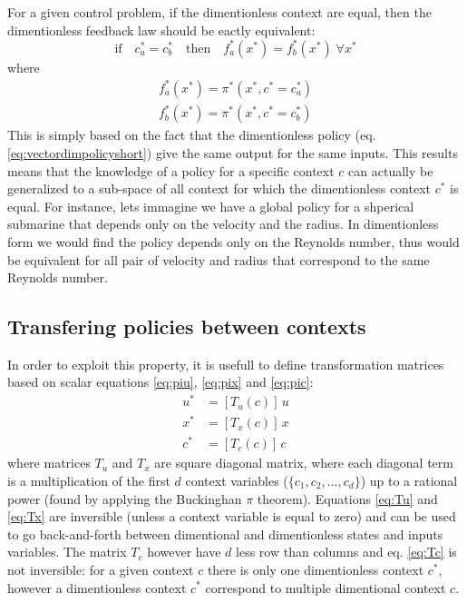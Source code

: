 For a given control problem, if the dimentionless context are equal, then the dimentionless feedback law should be eactly equivalent:
\begin{equation}
\text{if} \quad c_a^* = c_b^*  \quad \text{then} \quad f_a^*(x^*) = f_b^*(x^*) \; \forall x^*   
\end{equation}
where
\begin{align}
f_a^*(x^*) = \pi^*( x^* , c^* = c_a^*)\\
f_b^*(x^*) = \pi^*( x^* , c^* = c_b^*)
\end{align}
This is simply based on the fact that the dimentionless policy (eq. \eqref{eq:vectordimpolicyshort}) give the same output for the same inputs. This results means that the knowledge of a policy for a specific context $c$ can actually be generalized to a sub-space of all context for which the dimentionless context $c^*$ is equal. For instance, lets immagine we have a global policy for a shperical submarine that depends only on the velocity and the radius. In dimentionless form we would find the policy depends only on the Reynolds number, thus would be equivalent for all pair of velocity and radius that correspond to the same Reynolds number.



\subsection{Transfering policies between contexts}

In order to exploit this property, it is usefull to define transformation matrices based on scalar equations \eqref{eq:piu}, \eqref{eq:pix} and \eqref{eq:pic}:
\begin{align}
u^* &= \left[ T_u(c) \right] \, u  \label{eq:Tu} \\
x^* &= \left[ T_x(c) \right] \, x \label{eq:Tx} \\
c^* &= \left[ T_c(c) \right] \, c \label{eq:Tc}
\end{align}
where matrices $T_u$ and $T_x$ are square diagonal matrix, where each diagonal term is a multiplication of the first $d$ context variables ($\{c_1, c_2 , \hdots,c_d\}$) up to a rational power (found by applying the Buckinghan $\pi$ theorem). Equations \eqref{eq:Tu} and \eqref{eq:Tx} are inversible (unless a context variable is equal to zero) and can be used to go back-and-forth between dimentional and dimentionless states and inputs variables. The matrix $T_c$ however have $d$ less row than columns and eq. \eqref{eq:Tc} is not inversible: for a given context $c$ there is only one dimentionless context $c^*$, however a dimentionless context $c^*$ correspond to multiple dimentional context $c$.

